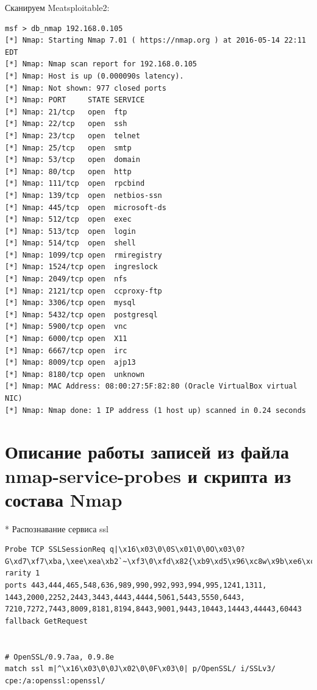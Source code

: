 \documentclass[12pt,a4paper]{report}
\begin{document}
Сканируем Meatsploitable2:
\begin{lstlisting}[breaklines]
msf > db_nmap 192.168.0.105
[*] Nmap: Starting Nmap 7.01 ( https://nmap.org ) at 2016-05-14 22:11 EDT
[*] Nmap: Nmap scan report for 192.168.0.105
[*] Nmap: Host is up (0.000090s latency).
[*] Nmap: Not shown: 977 closed ports
[*] Nmap: PORT     STATE SERVICE
[*] Nmap: 21/tcp   open  ftp
[*] Nmap: 22/tcp   open  ssh
[*] Nmap: 23/tcp   open  telnet
[*] Nmap: 25/tcp   open  smtp
[*] Nmap: 53/tcp   open  domain
[*] Nmap: 80/tcp   open  http
[*] Nmap: 111/tcp  open  rpcbind
[*] Nmap: 139/tcp  open  netbios-ssn
[*] Nmap: 445/tcp  open  microsoft-ds
[*] Nmap: 512/tcp  open  exec
[*] Nmap: 513/tcp  open  login
[*] Nmap: 514/tcp  open  shell
[*] Nmap: 1099/tcp open  rmiregistry
[*] Nmap: 1524/tcp open  ingreslock
[*] Nmap: 2049/tcp open  nfs
[*] Nmap: 2121/tcp open  ccproxy-ftp
[*] Nmap: 3306/tcp open  mysql
[*] Nmap: 5432/tcp open  postgresql
[*] Nmap: 5900/tcp open  vnc
[*] Nmap: 6000/tcp open  X11
[*] Nmap: 6667/tcp open  irc
[*] Nmap: 8009/tcp open  ajp13
[*] Nmap: 8180/tcp open  unknown
[*] Nmap: MAC Address: 08:00:27:5F:82:80 (Oracle VirtualBox virtual NIC)
[*] Nmap: Nmap done: 1 IP address (1 host up) scanned in 0.24 seconds
\end{lstlisting}

\section*{Описание работы записей из файла nmap-service-probes и скрипта из состава Nmap}

* Распознавание сервиса ssl
\begin{lstlisting}[breaklines]
Probe TCP SSLSessionReq q|\x16\x03\0\0S\x01\0\0O\x03\0?G\xd7\xf7\xba,\xee\xea\xb2`~\xf3\0\xfd\x82{\xb9\xd5\x96\xc8w\x9b\xe6\xc4\xdb<=\xdbo\xef\x10n\0\0(\0\x16\0\x13\0\x0a\0f\0\x05\0\x04\0e\0d\0c\0b\0a\0`\0\x15\0\x12\0\x09\0\x14\0\x11\0\x08\0\x06\0\x03\x01\0|
rarity 1
ports 443,444,465,548,636,989,990,992,993,994,995,1241,1311,
1443,2000,2252,2443,3443,4443,4444,5061,5443,5550,6443,
7210,7272,7443,8009,8181,8194,8443,9001,9443,10443,14443,44443,60443
fallback GetRequest


# OpenSSL/0.9.7aa, 0.9.8e
match ssl m|^\x16\x03\0\0J\x02\0\0F\x03\0| p/OpenSSL/ i/SSLv3/ cpe:/a:openssl:openssl/
\end{lstlisting}
\end{document}

